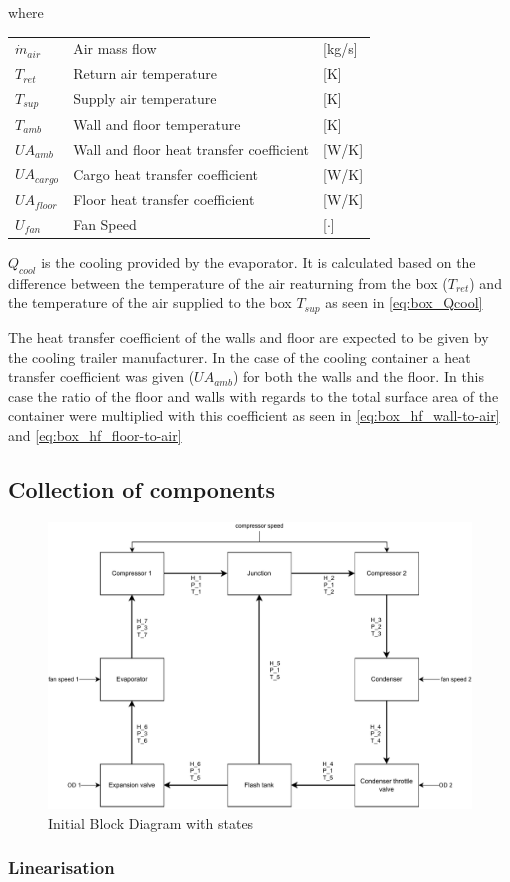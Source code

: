 where
\begin{center}
	\begin{tabular}{l p{8cm} l}
		$\dot{m}_{air}$			& Air mass flow 									& [\si{kg}/{\si{s}}] \\		
			$T_{ret}$			& Return air temperature 							& [\si{K}] \\		
			$T_{sup}$			& Supply air temperature							& [\si{K}] \\		
			$T_{amb}$			& Wall and floor temperature 						& [\si{K}] \\		
			$U A_{amb}$			& Wall and floor heat transfer coefficient 			& [\si{W}/\si{K}] \\		
			$U A_{cargo}$		& Cargo heat transfer coefficient 					& [\si{W}/\si{K}] \\		
			$U A_{floor}$		& Floor heat transfer coefficient 					& [\si{W}/\si{K}] \\		
			$U_{fan}$			& Fan Speed 										& [$\cdot$]
	\end{tabular}
\end{center}
	
	$Q_{cool}$ is the cooling provided by the evaporator. It is calculated based on the difference between the temperature of the air reaturning from the box ($T_{ret}$) and the temperature of the air supplied to the box $T_{sup}$ as seen in \cref{eq:box_Qcool}
	
	The heat transfer coefficient of the walls and floor are expected to be given by the cooling trailer manufacturer. In the case of the cooling container a heat transfer coefficient was given ($U A_{amb}$) for both the walls and the floor. In this case the ratio of the floor and walls with regards to the total surface area of the container were multiplied with this coefficient as seen in \cref{eq:box_hf_wall-to-air} and \cref{eq:box_hf_floor-to-air}


\clearpage
\subsection{Collection of components}

\begin{figure}[h!]
	\centering
	\includegraphics[width=1\textwidth]{Graphics/Block Diagram.pdf}
	\caption{Initial Block Diagram with states}
	\label{fig:Block_diagram}
\end{figure}



\subsubsection{Linearisation}